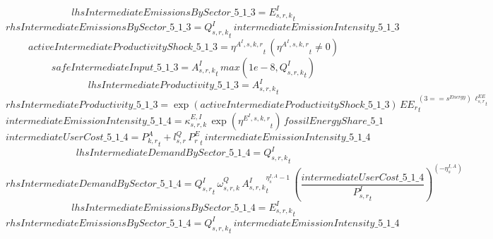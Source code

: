 \begin{dmath*}
lhsIntermediateEmissionsBySector\_5\_1\_3 = {{E^I_{s,r,k}}}_{t}
\end{dmath*}
\begin{dmath*}
rhsIntermediateEmissionsBySector\_5\_1\_3 = {{Q^{I}_{s,r,k}}}_{t}\, {intermediateEmissionIntensity\_5\_1\_3}
\end{dmath*}
\begin{dmath*}
activeIntermediateProductivityShock\_5\_1\_3 = {{\eta^{A^{I},s,k,r}}}_{t}\, \left({{\eta^{A^{I},s,k,r}}}_{t}\neq 0\right)
\end{dmath*}
\begin{dmath*}
safeIntermediateInput\_5\_1\_3 = {{A^{I}_{s,r,k}}}_{t}\, max(1e-8,{{Q^{I}_{s,r,k}}}_{t})
\end{dmath*}
\begin{dmath*}
lhsIntermediateProductivity\_5\_1\_3 = {{A^{I}_{s,r,k}}}_{t}
\end{dmath*}
\begin{dmath*}
rhsIntermediateProductivity\_5\_1\_3 = \exp\left({activeIntermediateProductivityShock\_5\_1\_3}\right)\, {{EE_r}}_{t}^{\left(3=={{s^{Energy}}}\right)\, {{\ell^{EE}_{s,r}}}_{t}}
\end{dmath*}
\begin{dmath*}
intermediateEmissionIntensity\_5\_1\_4 = {{\kappa^{E,I}_{s,r,k}}}\, \exp\left({{\eta^{E^{I},s,k,r}}}_{t}\right)\, {fossilEnergyShare\_5\_1}
\end{dmath*}
\begin{dmath*}
intermediateUserCost\_5\_1\_4 = {{P^{A}_{k,r}}}_{t}+{{l^{Q}_{s,r}}}\, {{P^E_r}}_{t}\, {intermediateEmissionIntensity\_5\_1\_4}
\end{dmath*}
\begin{dmath*}
lhsIntermediateDemandBySector\_5\_1\_4 = {{Q^{I}_{s,r,k}}}_{t}
\end{dmath*}
\begin{dmath*}
rhsIntermediateDemandBySector\_5\_1\_4 = {{Q^{I}_{s,r}}}_{t}\, {{\omega^{Q}_{s,r,k}}}\, {{A^{I}_{s,r,k}}}_{t}^{{{\eta^{I,A}_{s}}}-1}\, \left(\frac{{intermediateUserCost\_5\_1\_4}}{{{P^{I}_{s,r}}}_{t}}\right)^{\left(-{{\eta^{I,A}_{s}}}\right)}
\end{dmath*}
\begin{dmath*}
lhsIntermediateEmissionsBySector\_5\_1\_4 = {{E^I_{s,r,k}}}_{t}
\end{dmath*}
\begin{dmath*}
rhsIntermediateEmissionsBySector\_5\_1\_4 = {{Q^{I}_{s,r,k}}}_{t}\, {intermediateEmissionIntensity\_5\_1\_4}
\end{dmath*}
